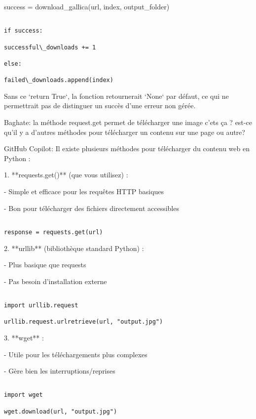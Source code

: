 success = download\_gallica(url, index, output\_folder)

\begin{verbatim}

if success:

successful\_downloads += 1

else:

failed\_downloads.append(index)

\end{verbatim}

Sans ce `return True`, la fonction retournerait `None` par défaut, ce qui ne permettrait pas de distinguer un succès d'une erreur non gérée.

Baghate: la méthode request.get permet de télécharger une image c'ets ça ? est-ce qu'il y a d'autres méthodes pour télécharger un contenu sur une page ou autre?

GitHub Copilot: Il existe plusieurs méthodes pour télécharger du contenu web en Python :

1. **requests.get()** (que vous utilisez) :

- Simple et efficace pour les requêtes HTTP basiques

- Bon pour télécharger des fichiers directement accessibles

\begin{verbatim}

response = requests.get(url)

\end{verbatim}

2. **urllib** (bibliothèque standard Python) :

- Plus basique que requests

- Pas besoin d'installation externe

\begin{verbatim}

import urllib.request

urllib.request.urlretrieve(url, "output.jpg")

\end{verbatim}

3. **wget** :

- Utile pour les téléchargements plus complexes

- Gère bien les interruptions/reprises

\begin{verbatim}

import wget

wget.download(url, "output.jpg")

\end{verbatim}


